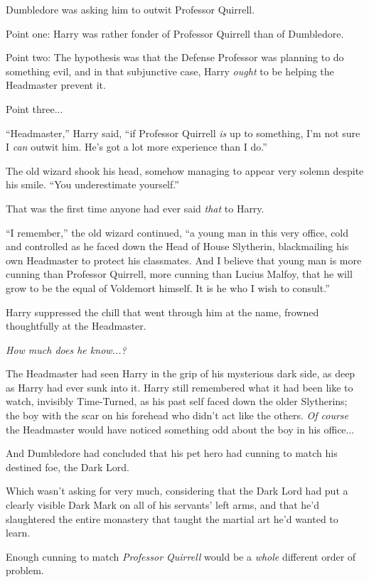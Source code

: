 Dumbledore was asking him to outwit Professor Quirrell.

Point one: Harry was rather fonder of Professor Quirrell than of Dumbledore.

Point two: The hypothesis was that the Defense Professor was planning to do something evil, and in that subjunctive case, Harry \emph{ought} to be helping the Headmaster prevent it.

Point three...

``Headmaster,'' Harry said, ``if Professor Quirrell \emph{is} up to something, I'm not sure I \emph{can} outwit him. He's got a lot more experience than I do.''

The old wizard shook his head, somehow managing to appear very solemn despite his smile. ``You underestimate yourself.''

That was the first time anyone had ever said \emph{that} to Harry.

``I remember,'' the old wizard continued, ``a young man in this very office, cold and controlled as he faced down the Head of House Slytherin, blackmailing his own Headmaster to protect his classmates. And I believe that young man is more cunning than Professor Quirrell, more cunning than Lucius Malfoy, that he will grow to be the equal of Voldemort himself. It is he who I wish to consult.''

Harry suppressed the chill that went through him at the name, frowned thoughtfully at the Headmaster.

\emph{How much does he know...?}

The Headmaster had seen Harry in the grip of his mysterious dark side, as deep as Harry had ever sunk into it. Harry still remembered what it had been like to watch, invisibly Time-Turned, as his past self faced down the older Slytherins; the boy with the scar on his forehead who didn't act like the others. \emph{Of course} the Headmaster would have noticed something odd about the boy in his office...

And Dumbledore had concluded that his pet hero had cunning to match his destined foe, the Dark Lord.

Which wasn't asking for very much, considering that the Dark Lord had put a clearly visible Dark Mark on all of his servants' left arms, and that he'd slaughtered the entire monastery that taught the martial art he'd wanted to learn.

Enough cunning to match \emph{Professor Quirrell} would be a \emph{whole} different order of problem.

